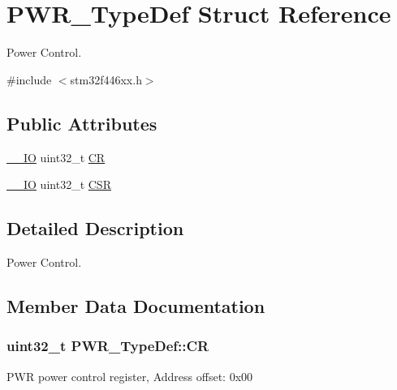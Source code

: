 \hypertarget{struct_p_w_r___type_def}{}\section{P\+W\+R\+\_\+\+Type\+Def Struct Reference}
\label{struct_p_w_r___type_def}


Power Control.  




{\ttfamily \#include $<$stm32f446xx.\+h$>$}

\subsection*{Public Attributes}
\begin{DoxyCompactItemize}
\item 
\hyperlink{core__sc300_8h_aec43007d9998a0a0e01faede4133d6be}{\+\_\+\+\_\+\+IO} uint32\+\_\+t \hyperlink{struct_p_w_r___type_def_aeb6bcdb2b99d58b9a0ffd86deb606eac}{CR}
\item 
\hyperlink{core__sc300_8h_aec43007d9998a0a0e01faede4133d6be}{\+\_\+\+\_\+\+IO} uint32\+\_\+t \hyperlink{struct_p_w_r___type_def_ae17097e69c88b6c00033d6fb84a8182b}{C\+SR}
\end{DoxyCompactItemize}


\subsection{Detailed Description}
Power Control. 

\subsection{Member Data Documentation}
\subsubsection[{\texorpdfstring{CR}{CR}}]{ uint32\+\_\+t P\+W\+R\+\_\+\+Type\+Def\+::\+CR}\hypertarget{struct_p_w_r___type_def_aeb6bcdb2b99d58b9a0ffd86deb606eac}{}\label{struct_p_w_r___type_def_aeb6bcdb2b99d58b9a0ffd86deb606eac}
P\+WR power control register, Address offset\+: 0x00 
